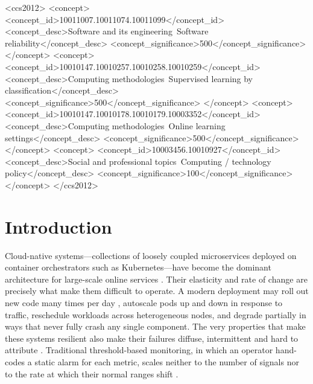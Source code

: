 \documentclass[acmsmall]{acmart}
\begin{document}
\begin{CCSXML}
<ccs2012>
 <concept>
  <concept_id>10011007.10011074.10011099</concept_id>
  <concept_desc>Software and its engineering~Software reliability</concept_desc>
  <concept_significance>500</concept_significance>
 </concept>
 <concept>
  <concept_id>10010147.10010257.10010258.10010259</concept_id>
  <concept_desc>Computing methodologies~Supervised learning by classification</concept_desc>
  <concept_significance>500</concept_significance>
 </concept>
 <concept>
  <concept_id>10010147.10010178.10010179.10003352</concept_id>
  <concept_desc>Computing methodologies~Online learning settings</concept_desc>
  <concept_significance>500</concept_significance>
 </concept>
 <concept>
  <concept_id>10003456.10010927</concept_id>
  <concept_desc>Social and professional topics~Computing / technology policy</concept_desc>
  <concept_significance>100</concept_significance>
 </concept>
</ccs2012>
\end{CCSXML}


\maketitle

\section{Introduction}\label{sec:intro}

Cloud-native systems---collections of loosely coupled microservices deployed on container orchestrators such as Kubernetes---have become the dominant architecture for large-scale online services \cite{cncf2024survey}. Their elasticity and rate of change are precisely what make them difficult to operate. A modern deployment may roll out new code many times per day \cite{dora2024}, autoscale pods up and down in response to traffic, reschedule workloads across heterogeneous nodes, and degrade partially in ways that never fully crash any single component. The very properties that make these systems resilient also make their failures diffuse, intermittent and hard to attribute \cite{mohammad2025resilient}. Traditional threshold-based monitoring, in which an operator hand-codes a static alarm for each metric, scales neither to the number of signals nor to the rate at which their normal ranges shift \cite{islam2021,mart2020}.
\end{document}
